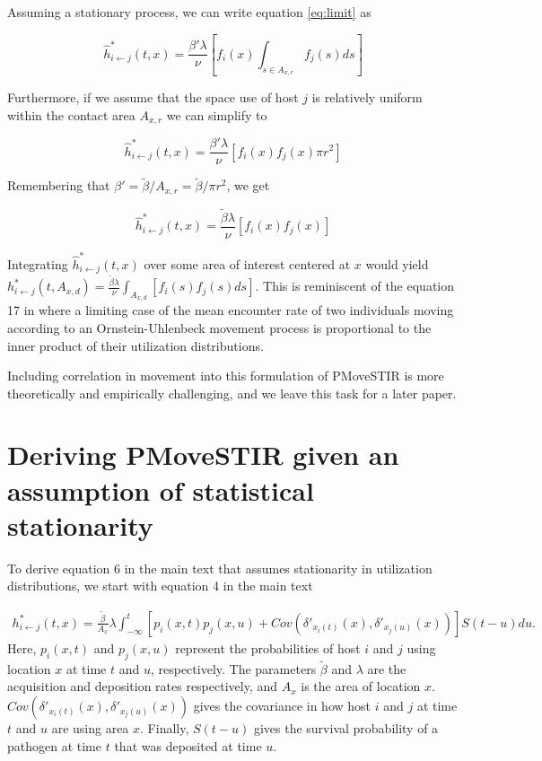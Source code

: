 \documentclass[letterpaper]{article}
\begin{document}
Assuming a stationary process, we can write equation \ref{eq:limit} as

\begin{equation}
    \hat{h}^*_{i \leftarrow j}(t, x) =  \frac{\beta' \lambda}{\nu} [f_i(x) \int_{s \in A_{x, r}} f_j(s) ds]
\end{equation}

Furthermore, if we assume that the space use of host $j$ is relatively uniform within the contact area $A_{x, r}$ we can simplify to

\begin{equation}
    \hat{h}^*_{i \leftarrow j}(t, x) =  \frac{\beta' \lambda}{\nu} [f_i(x) f_j(x) \pi r^2]
\end{equation}

Remembering that $\beta' = \tilde{\beta} / A_{x, r} = \tilde{\beta} / \pi r^2$, we get 

\begin{equation}
    \hat{h}^*_{i \leftarrow j}(t, x) =  \frac{\tilde{\beta} \lambda}{\nu} [f_i(x) f_j(x)]
\end{equation}

Integrating $\hat{h}^*_{i \leftarrow j}(t, x)$ over some area of interest centered at $x$ would yield  $h^*_{i \leftarrow j}(t, A_{x, d}) = \frac{\tilde{\beta} \lambda}{\nu} \int_{A_{x, d}} [f_i(s) f_j(s) ds] $. This is reminiscent of the equation 17 in \cite{Martinez-Garcia2020} where a limiting case of the mean encounter rate of two individuals moving according to an Ornstein-Uhlenbeck movement process is proportional to the inner product of their utilization distributions. 

Including correlation in movement into this formulation of PMoveSTIR is more theoretically and empirically challenging, and we leave this task for a later paper.

\section{Deriving PMoveSTIR given an assumption of statistical stationarity}

To derive equation 6 in the main text that assumes stationarity in utilization distributions, we start with equation 4 in the main text

\begin{equation}
    \begin{aligned}
        h^*_{i \leftarrow j}(t, x) = \frac{\tilde{\beta}}{A_x} \lambda \int_{-\infty}^{t} [p_i(x, t) p_j(x, u) + Cov(\delta'_{x_i(t)}(x), \delta'_{x_j(u)}(x))] S(t - u) du.
    \end{aligned}
    \label{eq:foi_cov}
\end{equation}
Here, $p_i(x, t)$ and $p_j(x, u)$ represent the probabilities of host $i$ and $j$ using location $x$ at time $t$ and $u$, respectively. The parameters $\tilde{\beta}$ and $\lambda$ are the acquisition and deposition rates respectively, and $A_x$ is the area of location $x$.  $Cov(\delta'_{x_i(t)}(x), \delta'_{x_j(u)}(x))$ gives the covariance in how host $i$ and $j$ at time $t$ and $u$ are using area $x$.  Finally, $S(t - u)$  gives the survival probability of a pathogen at time $t$ that was deposited at time $u$. 
\end{document}
